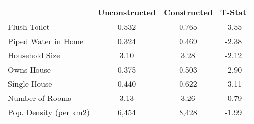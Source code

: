 \begin{tabular}{l*{1}{ccc}}
 &Unconstructed &Constructed &T-Stat  \\
\hline 
Flush Toilet &      0.532 &      0.765 &      -3.55  \\
Piped Water in Home &      0.324 &      0.469 &      -2.38  \\
Household Size &       3.10 &       3.28 &      -2.12  \\
Owns House &      0.375 &      0.503 &      -2.90  \\
Single House &      0.440 &      0.622 &      -3.11  \\
Number of Rooms &       3.13 &       3.26 &      -0.79  \\
Pop. Density (per km2) &      6,454 &      8,428 &      -1.99  \\
\hline
\end{tabular}